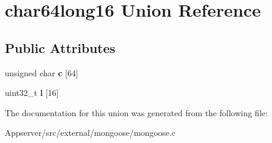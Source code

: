 \hypertarget{unionchar64long16}{}\section{char64long16 Union Reference}
\label{unionchar64long16}
\subsection*{Public Attributes}
\begin{DoxyCompactItemize}
\item 
unsigned char {\bfseries c} \mbox{[}64\mbox{]}\hypertarget{unionchar64long16_a7067dbe3b0ff3f11661acb8cd97bcff9}{}\label{unionchar64long16_a7067dbe3b0ff3f11661acb8cd97bcff9}

\item 
uint32\+\_\+t {\bfseries l} \mbox{[}16\mbox{]}\hypertarget{unionchar64long16_a4f1edebae3468a551ff2d0cdaecb467d}{}\label{unionchar64long16_a4f1edebae3468a551ff2d0cdaecb467d}

\end{DoxyCompactItemize}


The documentation for this union was generated from the following file\+:\begin{DoxyCompactItemize}
\item 
Appserver/src/external/mongoose/mongoose.\+c\end{DoxyCompactItemize}
